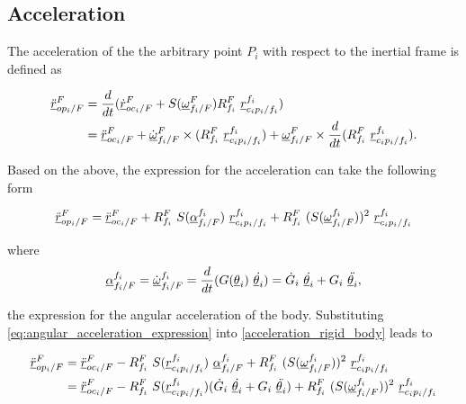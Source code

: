 \subsection{Acceleration}

The acceleration of the the arbitrary point $P_{i}$ with respect to the inertial frame 
is defined as
    
\begin{align*}
    \pvec{\ddot{r}}{op_{i}}{F}{F} 
    & = \frac{d}{dt}( \pvec{\dot{r}}{oc_{i}}{F}{F} + 
    S(\pvec{\omega}{f_{i}}{F}{F}) \rot{R}{f_{i}}{F} \ \pvec{r}{c_{i}p_{i}}{f_i}{f_i}) \\
    & = \pvec{\ddot{r}}{oc_{i}}{F}{F} +  \pvec{\dot{\omega}}{f_{i}}{F}{F} \times 
    (\rot{R}{f_{i}}{F} \  \pvec{r}{c_{i}p_{i}}{f_i}{f_i}) + 
    \pvec{\omega}{f_{i}}{F}{F} \times 
    \frac{d}{dt}(\rot{R}{f_{i}}{F} \  \pvec{r}{c_{i}p_{i}}{f_i}{f_i}).
\end{align*}

Based on the above, the expression for the acceleration can take the 
following form 
    
\begin{equation}
    \pvec{\ddot{r}}{op_{i}}{F}{F} = \pvec{\ddot{r}}{oc_{i}}{F}{F} +
    \rot{R}{f_{i}}{F} \ S(\pvec{\alpha}{f_{i}}{F}{f_i}) \ \pvec{r}{c_{i}p_{i}}{f_i}{f_i}
    + \rot{R}{f_{i}}{F} \ (S(\pvec{\omega}{f_{i}}{F}{f_i}))^{2} \ \pvec{r}{c_{i}p_{i}}{f_i}{f_i}
    \label{acceleration_rigid_body}
\end{equation}

where 
\begin{equation}
    \pvec{\alpha}{f_{i}}{F}{f_i} = \pvec{\dot{\omega}}{f_{i}}{F}{f_i} = 
    \frac{d}{dt}(G(\vecd{\theta}_{i}) \ \dot{\vecd{\theta}_{i}}) = 
    \dot{G}_{i} \ \dot{\vecd{\theta}_{i}} + 
    G_{i} \ \ddot{\vecd{\theta}_{i}},
    \label{eq:angular_acceleration_expression}
\end{equation}

the expression for the angular acceleration of the body. Substituting 
\eqref{eq:angular_acceleration_expression} into \eqref{acceleration_rigid_body}
leads to 

\begin{align*}
   \pvec{\ddot{r}}{op_{i}}{F}{F} 
   & =  \pvec{\ddot{r}}{oc_{i}}{F}{F} - \rot{R}{f_{i}}{F} \ S(\pvec{r}{c_{i}p_{i}}{f_i}{f_i}) \ \pvec{\alpha}{f_{i}}{F}{f_i}
    + \rot{R}{f_{i}}{F} \ (S(\pvec{\omega}{f_{i}}{F}{f_i}))^{2} \ \pvec{r}{c_{i}p_{i}}{f_i}{f_i} \\ 
    & = \pvec{\ddot{r}}{oc_{i}}{F}{F} - \rot{R}{f_{i}}{F} \ S(\pvec{r}{c_{i}p_{i}}{f_i}{f_i}) (\dot{G}_{i} \ \dot{\vecd{\theta}_{i}} + 
    G_{i} \ \ddot{\vecd{\theta}_{i}}) + \rot{R}{f_{i}}{F} \ (S(\pvec{\omega}{f_{i}}{F}{f_i}))^{2} \ \pvec{r}{c_{i}p_{i}}{f_i}{f_i} 
\end{align*}

